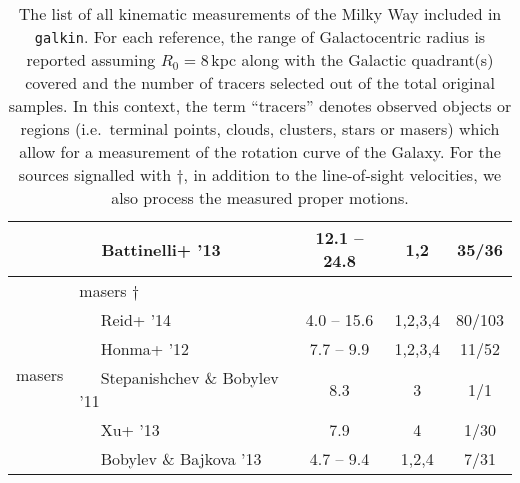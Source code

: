 \documentclass[twocolumn,prd,reprint,preprintnumbers,amsmath,amssymb,superscriptaddress,nofootinbib]{revtex4}
\begin{document}
\begin{table*}[htp]
\begin{center}
\begin{tabular}{|c|l c  c c|}
					& $\quad$ Battinelli+ '13 \cite{Battinelli2013} 					& 12.1 -- 24.8 					& 1,2		& \hspace{0.16cm}35/36\hspace{0.16cm} 				\\
\hline
\multirow{6}{*}{masers}	& masers $\dagger$											&						&		&					\\
					& $\quad$ Reid+ '14 \cite{Reid2014}  							& \hspace{0.16cm}4.0 -- 15.6 			& 1,2,3,4	& \hspace{0.16cm}80/103					\\
					& $\quad$ Honma+ '12 \cite{Honma2012} 							& 7.7 -- 9.9				 	& 1,2,3,4	& \hspace{0.16cm}11/52\hspace{0.16cm} 					\\
					& $\quad$ Stepanishchev \& Bobylev '11 \cite{StepanishchevBobylev2011} 			& 8.3						& 3		& \hspace{0.32cm}1/1\hspace{0.32cm} 					\\
					& $\quad$ Xu+ '13 \cite{Xu2013} 							& 7.9 						& 4		& \hspace{0.32cm}1/30\hspace{0.16cm} 					\\
					& $\quad$ Bobylev \& Bajkova '13 \cite{BobylevBajkova2013} 				& 4.7 -- 9.4				 	& 1,2,4		& \hspace{0.32cm}7/31\hspace{0.16cm} 					\\
\hline
\end{tabular}

\caption{The list of all kinematic measurements of the Milky Way included in \texttt{galkin}. For each reference, the range of Galactocentric radius is reported assuming $R_0=8\,$kpc along with the Galactic quadrant(s) covered and the number of tracers selected out of the total original samples. In this context, the term ``tracers'' denotes observed objects or regions (i.e.~terminal points, clouds, clusters, stars or masers) which allow for a measurement of the rotation curve of the Galaxy. For the sources signalled with $\dagger$, in addition to the line-of-sight velocities, we also process the measured proper motions.}\label{tab:data}
\end{center}
\end{table*}
\end{document}
